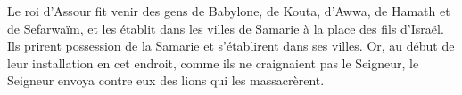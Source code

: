 Le roi d’Assour fit venir des gens de Babylone,
	de Kouta, d’Awwa, de Hamath et de Sefarwaïm,
	et les établit dans les villes de Samarie à la place des fils d’Israël.
Ils prirent possession de la Samarie et s’établirent dans ses villes.
Or, au début de leur installation en cet endroit,
	comme ils ne craignaient pas le Seigneur,
	le Seigneur envoya contre eux des lions qui les massacrèrent.
